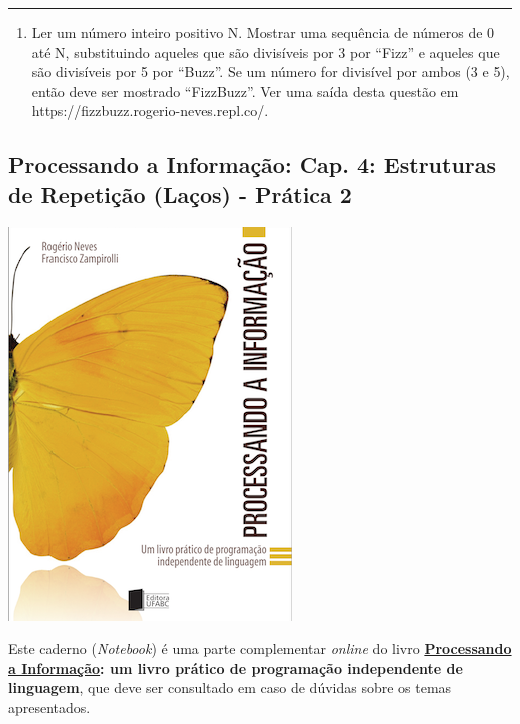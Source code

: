 \documentclass[12pt,a4paper]{article}
\renewcommand{\linethickness}{0.05em}
\providecommand{\tightlist}{%
      \setlength{\itemsep}{0pt}\setlength{\parskip}{0pt}}
\begin{document}
    \begin{center}\rule{0.5\linewidth}{\linethickness}\end{center}

\begin{enumerate}
\def\labelenumi{\arabic{enumi}.}
\setcounter{enumi}{5}
\tightlist
\item
  Ler um número inteiro positivo N. Mostrar uma sequência de números de
  0 até N, substituindo aqueles que são divisíveis por 3 por ``Fizz'' e
  aqueles que são divisíveis por 5 por ``Buzz''. Se um número for
  divisível por ambos (3 e 5), então deve ser mostrado ``FizzBuzz''. Ver
  uma saída desta questão em https://fizzbuzz.rogerio-neves.repl.co/.
\end{enumerate}

    \hypertarget{processando-a-informauxe7uxe3o-cap.-4-estruturas-de-repetiuxe7uxe3o-lauxe7os---pruxe1tica-2}{%
\subsection{Processando a Informação: Cap. 4: Estruturas de Repetição
(Laços) - Prática
2}\label{processando-a-informauxe7uxe3o-cap.-4-estruturas-de-repetiuxe7uxe3o-lauxe7os---pruxe1tica-2}}

    \includegraphics{"figs/Capa_Processando_Informacao.jpg"}

Este caderno (\emph{Notebook}) é uma parte complementar \emph{online} do
livro
\textbf{\href{https://editora.ufabc.edu.br/matematica-e-ciencias-da-computacao/58-processando-a-informacao}{Processando
a Informação}: um livro prático de programação independente de
linguagem}, que deve ser consultado em caso de dúvidas sobre os temas
apresentados.
\end{document}
